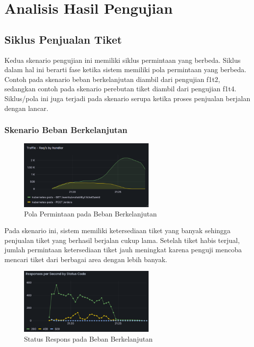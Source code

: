 \section{Analisis Hasil Pengujian}

\subsection{Siklus Penjualan Tiket}

Kedua skenario pengujian ini memiliki siklus permintaan yang berbeda. Siklus dalam hal ini berarti fase ketika sistem memiliki pola permintaan yang berbeda. Contoh pada skenario beban berkelanjutan diambil dari pengujian f1t2, sedangkan contoh pada skenario perebutan tiket diambil dari pengujian f1t4. Siklus/pola ini juga terjadi pada skenario serupa ketika proses penjualan berjalan dengan lancar.

\subsubsection{Skenario Beban Berkelanjutan}

\begin{figure}[htbp]
    \centering
    \includegraphics[width=0.6\textwidth]{resources/chapter-4/pattern-stress-traffic.png}
    \caption{Pola Permintaan pada Beban Berkelanjutan}
    \label{fig:pattern-stress-traffic}
\end{figure}

Pada skenario ini, sistem memiliki ketersediaan tiket yang banyak sehingga penjualan tiket yang berhasil berjalan cukup lama. Setelah tiket habis terjual, jumlah permintaan ketersediaan tiket jauh meningkat karena penguji mencoba mencari tiket dari berbagai area dengan lebih banyak.

\begin{figure}[htbp]
    \centering
    \includegraphics[width=0.6\textwidth]{resources/chapter-4/pattern-stress-order.png}
    \caption{Status Respons pada Beban Berkelanjutan}
    \label{fig:pattern-stress-order}
\end{figure}


